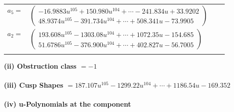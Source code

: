 \documentclass[1p]{elsarticle_modified}
\theoremstyle{definition}
\begin{document}
\begin{tabular}{m{7pt} m{180pt} m{7pt} m{180pt} }
\flushright $a_{5}=$&$\begin{pmatrix}-16.9883 u^{105}+150.980 u^{104}+\cdots-241.834 u+33.9202\\48.9374 u^{105}-391.734 u^{104}+\cdots+508.341 u-73.9905\end{pmatrix}$ \\
\flushright $a_{2}=$&$\begin{pmatrix}193.608 u^{105}-1303.08 u^{104}+\cdots+1072.35 u-154.685\\51.6786 u^{105}-376.900 u^{104}+\cdots+402.827 u-56.7005\end{pmatrix}$\\&\end{tabular}
\flushleft \textbf{(ii) Obstruction class $= -1$}\\~\\
\flushleft \textbf{(iii) Cusp Shapes $= 187.107 u^{105}-1299.22 u^{104}+\cdots+1186.54 u-169.352$}\\~\\
\newpage\renewcommand{\arraystretch}{1}
\flushleft \textbf{(iv) u-Polynomials at the component}\newline \\
\end{document}
